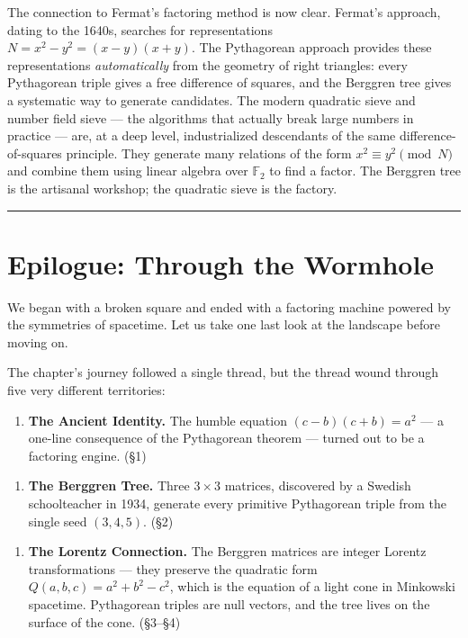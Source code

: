 \documentclass[11pt,openany]{book}
\theoremstyle{definition}
\theoremstyle{plain}
\theoremstyle{remark}
\begin{document}
The connection to Fermat's factoring method is now clear. Fermat's approach, dating to the 1640s, searches for representations $N = x^2 - y^2 = (x - y)(x + y)$. The Pythagorean approach provides these representations \textit{automatically} from the geometry of right triangles: every Pythagorean triple gives a free difference of squares, and the Berggren tree gives a systematic way to generate candidates. The modern quadratic sieve and number field sieve — the algorithms that actually break large numbers in practice — are, at a deep level, industrialized descendants of the same difference-of-squares principle. They generate many relations of the form $x^2 \equiv y^2 \pmod{N}$ and combine them using linear algebra over $\mathbb{F}_2$ to find a factor. The Berggren tree is the artisanal workshop; the quadratic sieve is the factory.

\bigskip\noindent\rule{\textwidth}{0.4pt}\bigskip


\section*{Epilogue: Through the Wormhole}


We began with a broken square and ended with a factoring machine powered by the symmetries of spacetime. Let us take one last look at the landscape before moving on.

The chapter's journey followed a single thread, but the thread wound through five very different territories:

\begin{enumerate}
\item \textbf{The Ancient Identity.} The humble equation $(c - b)(c + b) = a^2$ — a one-line consequence of the Pythagorean theorem — turned out to be a factoring engine. (§1)
\end{enumerate}

\begin{enumerate}
\item \textbf{The Berggren Tree.} Three $3 \times 3$ matrices, discovered by a Swedish schoolteacher in 1934, generate every primitive Pythagorean triple from the single seed $(3, 4, 5)$. (§2)
\end{enumerate}

\begin{enumerate}
\item \textbf{The Lorentz Connection.} The Berggren matrices are integer Lorentz transformations — they preserve the quadratic form $Q(a, b, c) = a^2 + b^2 - c^2$, which is the equation of a light cone in Minkowski spacetime. Pythagorean triples are null vectors, and the tree lives on the surface of the cone. (§3–§4)
\end{enumerate}
\end{document}
